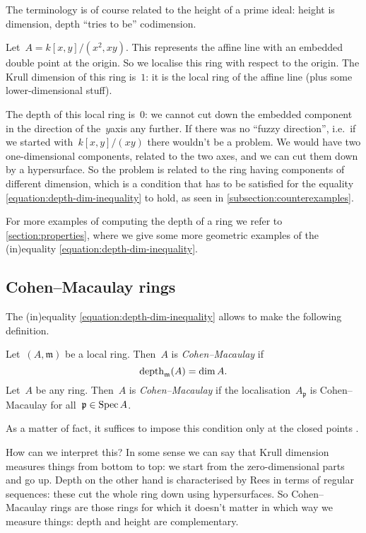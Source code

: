 \documentclass[10pt,a4paper]{article}
\begin{document}
The terminology is of course related to the height of a prime ideal: height is dimension, depth ``tries to be'' codimension.

\begin{example}
  Let~$A=k[x,y]/(x^2,xy)$. This represents the affine line with an embedded double point at the origin. So we localise this ring with respect to the origin. The Krull dimension of this ring is~$1$: it is the local ring of the affine line (plus some lower-dimensional stuff).
  
  The depth of this local ring is~$0$: we cannot cut down the embedded component in the direction of the~$y$\dash axis any further. If there was no ``fuzzy direction'', i.e.\ if we started with~$k[x,y]/(xy)$ there wouldn't be a problem. We would have two one-dimensional components, related to the two axes, and we can cut them down by a hypersurface. So the problem is related to the ring having components of different dimension, which is a condition that has to be satisfied for the equality \eqref{equation:depth-dim-inequality} to hold, as seen in \cref{subsection:counterexamples}.
\end{example}

For more examples of computing the depth of a ring we refer to \cref{section:properties}, where we give some more geometric examples of the (in)equality \eqref{equation:depth-dim-inequality}.


\subsection{Cohen--Macaulay rings}
The (in)equality \eqref{equation:depth-dim-inequality} allows to make the following definition.
\begin{definition}
  Let~$(A,\mathfrak{m})$ be a local ring. Then~$A$ is \emph{Cohen--Macaulay} if
  \begin{equation}
    \operatorname{depth}_{\mathfrak{m}}(A)=\dim A.
  \end{equation}
  Let~$A$ be any ring. Then~$A$ is \emph{Cohen--Macaulay} if the localisation~$A_{\mathfrak{p}}$ is Cohen--Macaulay for all~$\mathfrak{p}\in\operatorname{Spec} A$.
\end{definition}
As a matter of fact, it suffices to impose this condition only at the closed points \cite[proposition 18.8]{eisenbud-commutative-algebra}.

How can we interpret this? In some sense we can say that Krull dimension measures things from bottom to top: we start from the zero-dimensional parts and go up. Depth on the other hand is characterised by Rees in terms of regular sequences: these cut the whole ring down using hypersurfaces. So Cohen--Macaulay rings are those rings for which it doesn't matter in which way we measure things: depth and height are complementary.
\end{document}
